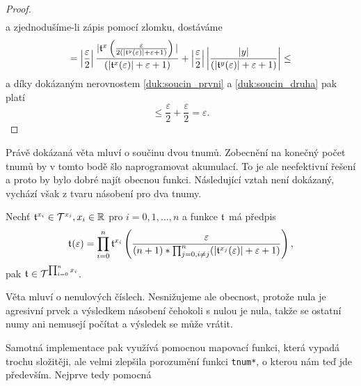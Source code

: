 \begin{theorem}
\begin{proof}
\begin{equation}
\begin{split}
\end{split}
\end{equation}
a zjednodušíme-li zápis pomocí zlomku, dostáváme
\begin{equation}
= \left|\frac{\varepsilon}{2}\right|\frac{|\mathfrak{t}^{x}\left(\frac{\varepsilon}{2(|\mathfrak{t}^{y}(\varepsilon)|+\varepsilon +1)}\right)|}{(|\mathfrak{t}^{x}(\varepsilon)|+\varepsilon +1)}+\left|\frac{\varepsilon}{2}\right|\left|\frac{|y|}{(|\mathfrak{t}^{y}(\varepsilon)|+\varepsilon +1)}\right|\leq
\end{equation}
a díky dokázaným nerovnostem \ref{duk:soucin_prvni} a \ref{duk:soucin_druha} pak platí
\begin{equation}
\leq\frac{\varepsilon}{2}+\frac{\varepsilon}{2}=\varepsilon.
\end{equation}
\end{proof}
\end{theorem}

Právě dokázaná věta mluví o součinu dvou tnumů. Zobecnění na konečný počet tnumů by v tomto bodě šlo naprogramovat akumulací. To je ale neefektivní řešení a proto by bylo dobré najít obecnou funkci. Následující vztah není dokázaný, vychází však z tvaru násobení pro dva tnumy.

\begin{fact}\label{vet:soucin_tnumu}
Nechť $\mathfrak{t}^{x_i}\in\mathcal{T}^{x_i}, x_i\in\mathbb{R}$ pro $i=0,1,\ldots,n$ a funkce $\mathfrak{t}^{}$ má předpis
\begin{equation}
\mathfrak{t}^{}(\varepsilon)=\prod_{i=0}^n\mathfrak{t}^{x_i}\left(\frac{\varepsilon}{(n+1)*\prod_{j=0, i\neq j}^n(|\mathfrak{t}^{x_j}(\varepsilon)|+\varepsilon +1)}\right),
\end{equation}
pak $\mathfrak{t}^{}\in\mathcal{T}^{\prod_{i=0}^nx_i}$.
\end{fact}

Věta mluví o nenulových číslech. Nesnižujeme ale obecnost, protože nula je agresivní prvek a výsledkem násobení čehokoli s nulou je nula, takže se ostatní numy ani nemusejí počítat a výsledek se může vrátit.

Samotná implementace pak využívá pomocnou mapovací funkci, která vypadá trochu složitěji, ale velmi zlepšila porozumění funkci \texttt{tnum*}, o kterou nám teď jde především. Nejprve tedy pomocná

